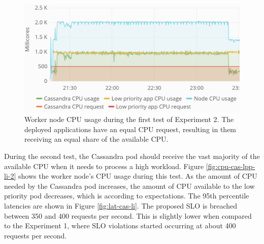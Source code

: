 \begin{figure}
\centering
\includegraphics[width=0.90\columnwidth]{Images/Experiments/CPU/Grafana/cpu-cas-lpp-li.PNG}
\caption{Worker node CPU usage during the first test of Experiment 2. The deployed applications have an equal CPU request, resulting in them receiving an equal share of the available CPU.}
\label{fig:cpu-cas-lpp-li}
\end{figure}

%
During the second test, the Cassandra pod should receive the vast majority of the available CPU when it needs to process a high workload. Figure \ref{fig:cpu-cas-lpp-li-2} shows the worker node's CPU usage during this test. As the amount of CPU needed by the Cassandra pod increases, the amount of CPU available to the low priority pod decreases, which is according to expectations. The 95th percentile latencies are shown in Figure \ref{fig:lat-cas-li}. The proposed SLO is breached between 350 and 400 requests per second. This is slightly lower when compared to the Experiment 1, where SLO violations started occurring at about 400 requests per second.


